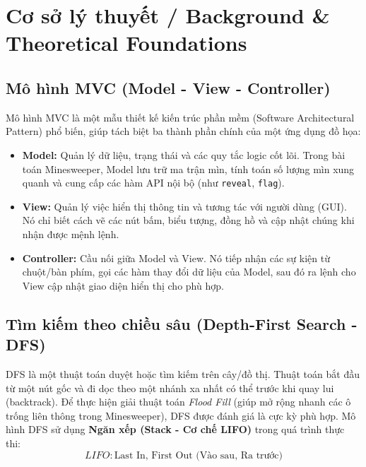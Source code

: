 \section{Cơ sở lý thuyết / Background \& Theoretical Foundations}

\subsection{Mô hình MVC (Model - View - Controller)}
Mô hình MVC là một mẫu thiết kế kiến trúc phần mềm (Software Architectural Pattern) phổ biến, giúp tách biệt ba thành phần chính của một ứng dụng đồ họa:
\begin{itemize}
    \item \textbf{Model:} Quản lý dữ liệu, trạng thái và các quy tắc logic cốt lõi. Trong bài toán Minesweeper, Model lưu trữ ma trận mìn, tính toán số lượng mìn xung quanh và cung cấp các hàm API nội bộ (như \texttt{reveal}, \texttt{flag}).
    \item \textbf{View:} Quản lý việc hiển thị thông tin và tương tác với người dùng (GUI). Nó chỉ biết cách vẽ các nút bấm, biểu tượng, đồng hồ và cập nhật chúng khi nhận được mệnh lệnh.
    \item \textbf{Controller:} Cầu nối giữa Model và View. Nó tiếp nhận các sự kiện từ chuột/bàn phím, gọi các hàm thay đổi dữ liệu của Model, sau đó ra lệnh cho View cập nhật giao diện hiển thị cho phù hợp.
\end{itemize}

\subsection{Tìm kiếm theo chiều sâu (Depth-First Search - DFS)}
DFS là một thuật toán duyệt hoặc tìm kiếm trên cây/đồ thị. Thuật toán bắt đầu từ một nút gốc và đi dọc theo một nhánh xa nhất có thể trước khi quay lui (backtrack).
Để thực hiện giải thuật toán \textit{Flood Fill} (giúp mở rộng nhanh các ô trống liên thông trong Minesweeper), DFS được đánh giá là cực kỳ phù hợp. Mô hình DFS sử dụng \textbf{Ngăn xếp (Stack - Cơ chế LIFO)} trong quá trình thực thi:
\[ LIFO: \text{Last In, First Out (Vào sau, Ra trước)} \]

